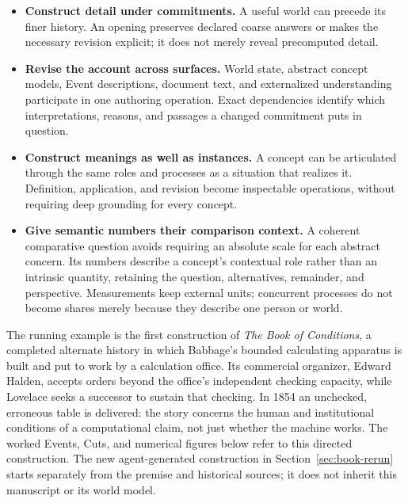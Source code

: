 \documentclass[11pt,a4paper]{article}
\begin{document}
\begin{itemize}
  \item \textbf{Construct detail under commitments.} A useful world can precede
    its finer history. An opening preserves declared coarse answers or makes
    the necessary revision explicit; it does not merely reveal precomputed detail.
  \item \textbf{Revise the account across surfaces.} World state, abstract concept
    models, Event descriptions, document text, and externalized understanding
    participate in one authoring operation. Exact dependencies identify which
    interpretations, reasons, and passages a changed commitment puts in question.
  \item \textbf{Construct meanings as well as instances.} A concept can be
    articulated through the same roles and processes as a situation that realizes
    it. Definition, application, and revision become inspectable operations,
    without requiring deep grounding for every concept.
  \item \textbf{Give semantic numbers their comparison context.} A coherent
    comparative question avoids requiring an absolute scale for each abstract
    concern. Its numbers describe a concept's contextual role rather than an
    intrinsic quantity, retaining the question, alternatives, remainder, and
    perspective.
    Measurements keep external units; concurrent processes do not become shares
    merely because they describe one person or world.
\end{itemize}

The running example is the first construction of \emph{The Book of Conditions}, a completed alternate
history in which Babbage's bounded calculating apparatus is built and put to
work by a calculation office. Its commercial organizer, Edward Halden, accepts
orders beyond the office's independent checking capacity, while Lovelace seeks
a successor to sustain that checking. In 1854 an unchecked, erroneous table is
delivered: the story concerns the human and institutional conditions of a
computational claim, not just whether the machine works.
The worked Events, Cuts, and numerical figures below refer to this directed
construction. The new agent-generated construction in
Section~\ref{sec:book-rerun} starts separately from the premise and historical
sources; it does not inherit this manuscript or its world model.
\end{document}
